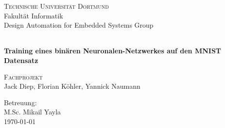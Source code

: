 \begin{titlepage}
	\begin{center}
		{\LARGE \textsc{Technische Universität Dortmund}} \\[4ex]
		{\Large Fakultät Informatik\\
		Design Automation for Embedded Systems Group \\}
	\end{center}
  \vspace*{4ex}
  \begin{center}
    {\Huge \textbf{~\\
    Training eines binären Neuronalen-Netzwerkes auf den MNIST Datensatz} \\}
  \end{center}
  \vspace*{7ex}
  \begin{center}
  	{\huge \textsc{Fachprojekt} \\[6ex] }
    {\Large Jack Diep, Florian Köhler, Yannick Naumann \\}
    \end{center}
    \vspace*{6ex}
	\begin{flushleft}
        {\large
		Betreuung: \\
		M.Sc. Mikail Yayla \\
		\vspace*{4ex}
		\today \\}
	\end{flushleft}	
\end{titlepage}
